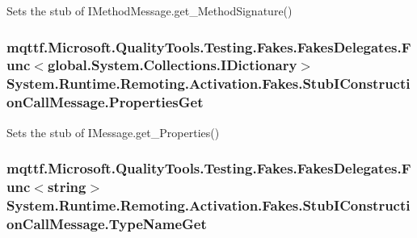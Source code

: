 Sets the stub of I\-Method\-Message.\-get\-\_\-\-Method\-Signature()

\hypertarget{class_system_1_1_runtime_1_1_remoting_1_1_activation_1_1_fakes_1_1_stub_i_construction_call_message_aa8b84268c727fa8c7b9fab88fcd5de28}{
\subsubsection[{Properties\-Get}]{\setlength{\rightskip}{0pt plus 5cm}mqttf.\-Microsoft.\-Quality\-Tools.\-Testing.\-Fakes.\-Fakes\-Delegates.\-Func$<$global.\-System.\-Collections.\-I\-Dictionary$>$ System.\-Runtime.\-Remoting.\-Activation.\-Fakes.\-Stub\-I\-Construction\-Call\-Message.\-Properties\-Get}}\label{class_system_1_1_runtime_1_1_remoting_1_1_activation_1_1_fakes_1_1_stub_i_construction_call_message_aa8b84268c727fa8c7b9fab88fcd5de28}


Sets the stub of I\-Message.\-get\-\_\-\-Properties()

\hypertarget{class_system_1_1_runtime_1_1_remoting_1_1_activation_1_1_fakes_1_1_stub_i_construction_call_message_a83f63a58fc945be752f45e221df234e1}{
\subsubsection[{Type\-Name\-Get}]{\setlength{\rightskip}{0pt plus 5cm}mqttf.\-Microsoft.\-Quality\-Tools.\-Testing.\-Fakes.\-Fakes\-Delegates.\-Func$<$string$>$ System.\-Runtime.\-Remoting.\-Activation.\-Fakes.\-Stub\-I\-Construction\-Call\-Message.\-Type\-Name\-Get}}\label{class_system_1_1_runtime_1_1_remoting_1_1_activation_1_1_fakes_1_1_stub_i_construction_call_message_a83f63a58fc945be752f45e221df234e1}


